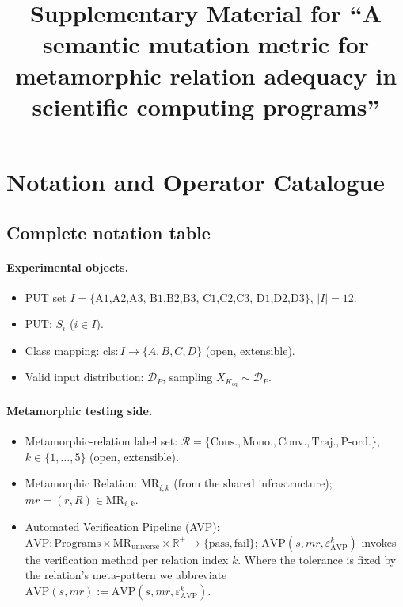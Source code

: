 \documentclass[review,12pt,authoryear]{elsarticle}
\begin{document}
\begin{frontmatter}
\title{Supplementary Material for ``A semantic mutation metric for
metamorphic relation adequacy in scientific computing programs''}
\end{frontmatter}

\appendix

\section{Notation and Operator Catalogue}\label{a.-notation-and-operator-catalogue}

\subsection{Complete notation table}\label{a.1-complete-notation-table}

\paragraph{Experimental objects.}
\begin{itemize}
\item PUT set $I = \{\text{A1,A2,A3, B1,B2,B3, C1,C2,C3, D1,D2,D3}\}$, $|I| = 12$.
\item PUT: $S_i$ ($i \in I$).
\item Class mapping: $\mathrm{cls} : I \to \{A, B, C, D\}$ (open, extensible).
\item Valid input distribution: $\mathcal{D}_P$, sampling $X_{K_{\mathrm{eq}}} \sim \mathcal{D}_P$.
\end{itemize}

\paragraph{Metamorphic testing side.}
\begin{itemize}
\item Metamorphic-relation label set: $\mathcal{R} = \{\text{Cons.}, \text{Mono.}, \text{Conv.}, \text{Traj.}, \text{P-ord.}\}$, $k \in \{1,\ldots,5\}$ (open, extensible).
\item Metamorphic Relation: $\mathrm{MR}_{i,k}$ (from the shared infrastructure); $\mathit{mr} = (r, R) \in \mathrm{MR}_{i,k}$.
\item Automated Verification Pipeline (AVP): $\mathrm{AVP} : \text{Programs} \times \mathrm{MR}_{\text{universe}} \times \mathbb{R}^+ \to \{\text{pass}, \text{fail}\}$; $\mathrm{AVP}(s, \mathit{mr}, \varepsilon_{\mathrm{AVP}}^k)$ invokes the verification method per relation index $k$. Where the tolerance is fixed by the relation's meta-pattern we abbreviate $\mathrm{AVP}(s, \mathit{mr}) := \mathrm{AVP}(s, \mathit{mr}, \varepsilon_{\mathrm{AVP}}^k)$.
\end{itemize}
\end{document}

